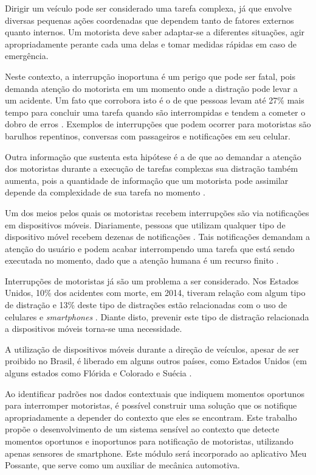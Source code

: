 \label{introducao}

Dirigir um veículo pode ser considerado uma tarefa complexa, já que envolve diversas pequenas ações coordenadas
que dependem tanto de fatores externos quanto internos. Um motorista deve saber adaptar-se a diferentes situações,
agir apropriadamente perante cada uma delas e tomar medidas rápidas em caso de emergência.

Neste contexto, a interrupção inoportuna é um perigo que pode ser fatal, pois demanda atenção do motorista em um momento
onde a distração pode levar a um acidente. Um fato que corrobora isto é o de que pessoas levam até 27\% mais tempo para
concluir uma tarefa quando são interrompidas e tendem a cometer o dobro de erros \cite{bailey2006need}. Exemplos de
interrupções que podem ocorrer para motoristas são barulhos repentinos, conversas com passageiros e notificações em
seu celular.

Outra informação que sustenta esta hipótese é a de que ao demandar a atenção dos motoristas durante a execução de
tarefas complexas sua distração também aumenta, pois a quantidade de informação que um motorista pode assimilar
depende da complexidade de sua tarefa no momento \cite{schneegass2013data}.

Um dos meios pelos quais os motoristas recebem interrupções são via notificações em dispositivos móveis.
Diariamente, pessoas que utilizam qualquer tipo de dispositivo móvel recebem dezenas de notificações
\cite{pielot2014situ}. Tais notificações demandam a atenção do usuário e podem acabar interrompendo uma tarefa que
está sendo executada no momento, dado que a atenção humana é um recurso finito \cite{simon1971designing}.

Interrupções de motoristas já são um problema a ser considerado. Nos Estados Unidos, 10\% dos acidentes com morte, em 2014, tiveram relação
com algum tipo de distração e 13\% deste tipo de distrações estão relacionadas com o uso de celulares e \textit{smartphones}
\cite{distracted2014}. Diante disto, prevenir este tipo de distração relacionada a dispositivos móveis torna-se uma necessidade.

A utilização de dispositivos móveis durante a direção de veículos, apesar de ser proibido no Brasil, é liberado em alguns
outros países, como Estados Unidos (em alguns estados como Flórida e Colorado \cite{cellphoneuse, distracteddriving} e Suécia \cite{swedendrive}.

Ao identificar padrões nos dados contextuais que indiquem momentos oportunos para interromper motoristas, é possível
construir uma solução que os notifique apropriadamente a depender do contexto que eles se encontram. Este trabalho propõe
o desenvolvimento de um sistema sensível ao contexto que detecte momentos oportunos e inoportunos para notificação de motoristas, utilizando
apenas sensores de smartphone. Este módulo será incorporado ao aplicativo Meu Possante, que serve como um auxiliar de mecânica automotiva.

